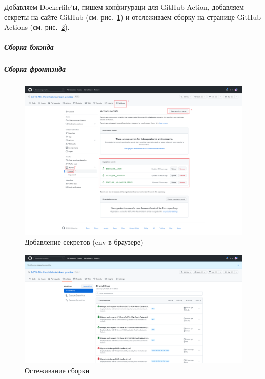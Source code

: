 Добавляем Dockerfile'ы, пишем конфигураци для GitHub Action,
добавляем секреты на сайте GitHub (см. рис.~\ref{fig:GitHubSecrets})
и отслеживаем сборку на странице GitHub Actions (см. рис.~\ref{fig:GitHubActions}). 

\subparagraph{Сборка бэкэнда} \hspace{0pt}





\subparagraph{Сборка фронтэнда} \hspace{0pt}







\begin{figure}[!h]
  \centering

  \includegraphics[width=18cm]
  {images/screenshots/GitHubSecrets.png}

  \caption{Добавление секретов (env в браузере)}
  \label{fig:GitHubSecrets}
\end{figure}

\begin{figure}[!h]
  \centering

  \includegraphics[width=18cm]
  {images/screenshots/GitHubActions.png}

  \caption{Остеживание сборки}
  \label{fig:GitHubActions}
\end{figure}

